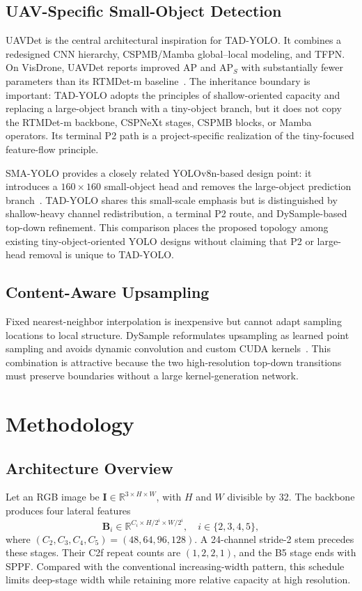 \documentclass[conference]{IEEEtran}
\begin{document}
\subsection{UAV-Specific Small-Object Detection}
UAVDet is the central architectural inspiration for TAD-YOLO.  It combines a
redesigned CNN hierarchy, CSPMB/Mamba global--local modeling, and TFPN.  On
VisDrone, UAVDet reports improved AP and AP$_S$ with substantially fewer
parameters than its RTMDet-m baseline~\cite{yang2026uavdet}.  The inheritance
boundary is important: TAD-YOLO adopts the principles of shallow-oriented
capacity and replacing a large-object branch with a tiny-object branch, but it
does not copy the RTMDet-m backbone, CSPNeXt stages, CSPMB blocks, or Mamba
operators.  Its terminal P2 path is a project-specific realization of the
tiny-focused feature-flow principle.

SMA-YOLO provides a closely related YOLOv8n-based design point: it introduces
a $160\times160$ small-object head and removes the large-object prediction
branch~\cite{zhou2025smayolo}.  TAD-YOLO shares this small-scale emphasis but
is distinguished by shallow-heavy channel redistribution, a terminal P2
route, and DySample-based top-down refinement.  This comparison places the
proposed topology among existing tiny-object-oriented YOLO designs without
claiming that P2 or large-head removal is unique to TAD-YOLO.

\subsection{Content-Aware Upsampling}
Fixed nearest-neighbor interpolation is inexpensive but cannot adapt sampling
locations to local structure.  DySample reformulates upsampling as learned
point sampling and avoids dynamic convolution and custom CUDA
kernels~\cite{liu2023dysample}.  This combination is attractive because the
two high-resolution top-down transitions must preserve boundaries without a
large kernel-generation network.

\section{Methodology}
\subsection{Architecture Overview}
Let an RGB image be
$\mathbf{I}\in\mathbb{R}^{3\times H\times W}$, with $H$ and $W$ divisible by
32.  The backbone produces four lateral features
\begin{equation}
\mathbf{B}_i\in\mathbb{R}^{C_i\times H/2^i\times W/2^i},\quad
i\in\{2,3,4,5\},
\end{equation}
where $(C_2,C_3,C_4,C_5)=(48,64,96,128)$.  A 24-channel stride-2 stem precedes
these stages.  Their C2f repeat counts are $(1,2,2,1)$, and the B5 stage ends
with SPPF.  Compared with the conventional increasing-width pattern, this
schedule limits deep-stage width while retaining more relative capacity at
high resolution.
\end{document}
